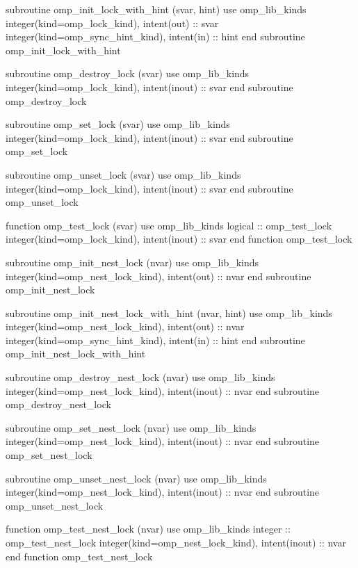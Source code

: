 {\begin{ompfFunction}
          subroutine omp_init_lock_with_hint (svar, hint)
           use omp_lib_kinds
           integer(kind=omp_lock_kind), intent(out) :: svar
           integer(kind=omp_sync_hint_kind), intent(in) :: hint
          end subroutine omp_init_lock_with_hint

          subroutine omp_destroy_lock (svar)
           use omp_lib_kinds
           integer(kind=omp_lock_kind), intent(inout) :: svar
          end subroutine omp_destroy_lock

          subroutine omp_set_lock (svar)
           use omp_lib_kinds
           integer(kind=omp_lock_kind), intent(inout) :: svar
          end subroutine omp_set_lock

          subroutine omp_unset_lock (svar)
           use omp_lib_kinds
           integer(kind=omp_lock_kind), intent(inout) :: svar
          end subroutine omp_unset_lock

          function omp_test_lock (svar)
           use omp_lib_kinds
           logical :: omp_test_lock
           integer(kind=omp_lock_kind), intent(inout) :: svar
          end function omp_test_lock

          subroutine omp_init_nest_lock (nvar)
           use omp_lib_kinds
           integer(kind=omp_nest_lock_kind), intent(out) :: nvar
          end subroutine omp_init_nest_lock

          subroutine omp_init_nest_lock_with_hint (nvar, hint)
           use omp_lib_kinds
           integer(kind=omp_nest_lock_kind), intent(out) :: nvar
           integer(kind=omp_sync_hint_kind), intent(in) :: hint
          end subroutine omp_init_nest_lock_with_hint

          subroutine omp_destroy_nest_lock (nvar)
           use omp_lib_kinds
           integer(kind=omp_nest_lock_kind), intent(inout) :: nvar
          end subroutine omp_destroy_nest_lock

          subroutine omp_set_nest_lock (nvar)
           use omp_lib_kinds
           integer(kind=omp_nest_lock_kind), intent(inout) :: nvar
          end subroutine omp_set_nest_lock

          subroutine omp_unset_nest_lock (nvar)
           use omp_lib_kinds
           integer(kind=omp_nest_lock_kind), intent(inout) :: nvar
          end subroutine omp_unset_nest_lock

          function omp_test_nest_lock (nvar)
           use omp_lib_kinds
           integer :: omp_test_nest_lock
           integer(kind=omp_nest_lock_kind), intent(inout) :: nvar
          end function omp_test_nest_lock


\end{ompfFunction}}
